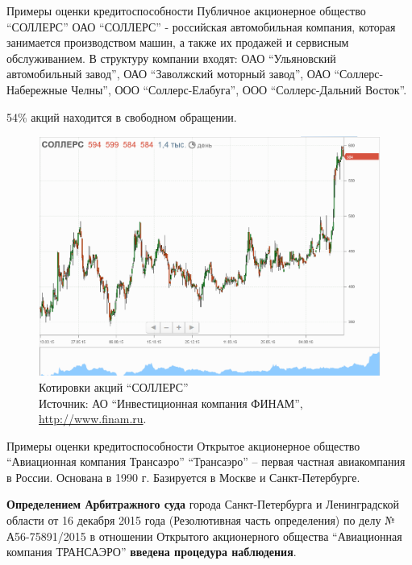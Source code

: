 \documentclass[_Banking_p2.tex]{subfiles}
\begin{document}
\begin{frame}{Примеры оценки кредитоспособности}
{Публичное акционерное общество ``СОЛЛЕРС''}
ОАО ``СОЛЛЕРС'' - российская автомобильная компания, которая занимается производством машин, а также их продажей и сервисным обслуживанием. В структуру компании входят: ОАО ``Ульяновский автомобильный завод'', ОАО ``Заволжский моторный завод'', ОАО ``Соллерс-Набережные Челны'', ООО ``Соллерс-Елабуга'', ООО ``Соллерс-Дальний Восток''. 

54\% акций находится в свободном обращении.
\end{frame}

\begin{frame}{}
\begin{figure}	
\centering
\includegraphics[scale=0.3]{img/SVAV_quotes.png}
\caption{Котировки акций ``СОЛЛЕРС''\\ 
Источник: АО ``Инвестиционная компания ФИНАМ'', \url{http://www.finam.ru}.}\label{fig:SVAV_quotes}
\end{figure}
\end{frame}

\begin{frame}{Примеры оценки кредитоспособности}
{Открытое акционерное общество ``Авиационная компания Трансаэро''}
``Трансаэро'' – первая частная авиакомпания в России. Основана в 1990 г. Базируется в Москве и Санкт-Петербурге. 

\textbf{Определением Арбитражного суда }города Санкт-Петербурга и Ленинградской области от 16 декабря 2015 года (Резолютивная часть определения) по делу № А56-75891/2015 в отношении Открытого акционерного общества ``Авиационная компания ТРАНСАЭРО'' \textbf{введена процедура наблюдения}.
\end{frame}
\end{document}
